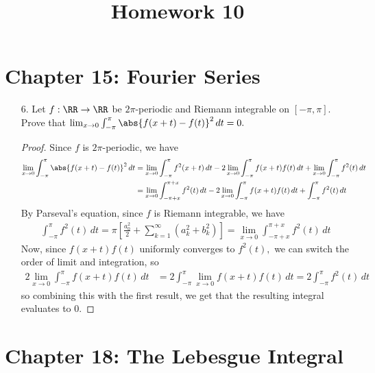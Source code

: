 \documentclass{article}
\begin{document}
\title{Homework 10}
\maketitle
\thispagestyle{fancy}

\section*{Chapter 15: Fourier Series}

\begin{itemize}
	\item[6.] Let $f:\RR\to\RR$ be $2\pi$-periodic and Riemann integrable on $[-\pi, \pi].$ Prove that $\lim_{x\to0}\int_{-\pi}^\pi \abs{f(x+t)-f(t)}^2\, dt=0.$
		\begin{proof}
			Since $f$ is $2\pi$-periodic, we have
			\begin{align*}
				\lim_{x\to 0}\int_{-\pi}^\pi \abs{f(x+t)-f(t)}^2\, dt &= \lim_{x\to0}\int_{-\pi}^\pi f^2(x+t)\, dt - 2\lim_{x\to0}\int_{-\pi}^\pi f(x+t)f(t)\, dt + \lim_{x\to0}\int_{-\pi}^\pi f^2(t)\, dt \\
				&= \lim_{x\to0} \int_{-\pi+x}^{\pi+x} f^2(t)\, dt - 2\lim_{x\to0}\int_{-\pi}^\pi f(x+t)f(t)\, dt + \int_{-\pi}^\pi f^2(t)\, dt
			\end{align*}
			By Parseval's equation, since $f$ is Riemann integrable, we have
			\begin{align*}
				\int_{-\pi}^{\pi} f^2(t)\, dt = \pi\left[ \frac{a_0^2}{2} + \sum_{k=1}^{\infty} (a_k^2+b_k^2) \right] = \lim_{x\to0}\int_{-\pi+x}^{\pi+x} f^2(t)\, dt 
			\end{align*}
			Now, since $f(x+t)f(t)$ uniformly converges to $f^2(t),$ we can switch the order of limit and integration, so
			\begin{align*}
				2\lim_{x\to0}\int_{-\pi}^\pi f(x+t)f(t)\, dt &= 2\int_{-\pi}^\pi \lim_{x\to0} f(x+t)f(t)\, dt = 2\int_{-\pi}^\pi f^2(t)\, dt
			\end{align*}
			so combining this with the first result, we get that the resulting integral evaluates to 0.
		\end{proof}
		
\end{itemize}


\section*{Chapter 18: The Lebesgue Integral}
\end{document}
